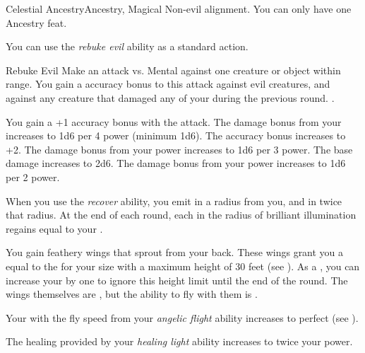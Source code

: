     \begin{magicalfeat}{Celestial Ancestry}{Ancestry, Magical}
        \featpre Non-evil alignment.
         You can only have one Ancestry feat.

         You can use the \textit{rebuke evil} ability as a standard action.
        \begin{magicalactiveability}{Rebuke Evil}
            \rankline
            Make an attack vs. Mental against one creature or object within \rngmed range.
            You gain a  accuracy bonus to this attack against evil creatures, and against any creature that damaged any of your  during the previous round.
            \hit {}.

            \rankline
             You gain a +1 accuracy bonus with the attack.
             The damage bonus from your  increases to 1d6 per 4 power (minimum 1d6).
             The accuracy bonus increases to +2.
             The damage bonus from your power increases to 1d6 per 3 power.
             The base damage increases to 2d6.
             The damage bonus from your power increases to 1d6 per 2 power.
        \end{magicalactiveability}

         When you use the \textit{recover} ability, you  emit  in a \largearea radius  from you, and  in twice that radius.
        At the end of each round, each  in the radius of brilliant illumination regains  equal to your .

         You gain feathery wings that sprout from your back.
        These wings grant you a  equal to the  for your size with a maximum height of 30 feet (see ).
        As a , you can increase your  by one to ignore this height limit until the end of the round.
        The wings themselves are , but the ability to fly with them is \magical.

         Your  with the fly speed from your \textit{angelic flight} ability increases to perfect (see ).

         The healing provided by your \textit{healing light} ability increases to twice your power.
    \end{magicalfeat}

